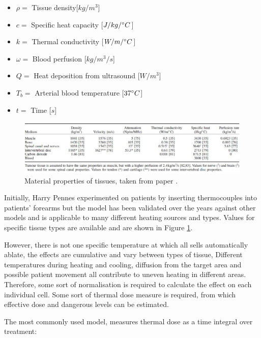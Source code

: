 \documentclass[11pt]{article} %
\begin{document}
	\begin{itemize}
		\item $ \rho = $ Tissue density[$ kg/m^3 $]
		\item  $ c= $ Specific heat capacity [$ J/kg/\degree C  $]
		\item $ k= $ Thermal conductivity  [$ W/m/\degree C $]
		\item $ \omega = $ Blood perfusion [$ kg/m^3/s $]
		\item $ Q= $ Heat deposition from ultrasound $ [W/m^3 $]
		\item $ T_b= $ Arterial blood temperature [$ 37\degree C $]
		\item $ t= $ Time [$ s $]
	\end{itemize}
	
	
	
	\begin{figure}
		\centering
		\includegraphics[width=1\linewidth]{Report_images/tissueproperties}
		\caption{Material properties of tissues, taken from paper \cite{Scott2014}.}
		\label{fig:tissueproperties}
	\end{figure}
	
	Initially, Harry Pennes experimented on patients by inserting thermocouples into patients' forearms but the model has been validated over the years against other models and is applicable to many different heating sources and types. Values for specific tissue types are available and are shown in Figure \ref{fig:tissueproperties}. 
	
	However, there is not one specific temperature at which all sells automatically ablate, the effects are cumulative and vary between types of tissue, Different temperatures during heating and cooling, diffusion from the target area and possible patient movement all contribute to uneven heating in different areas. Therefore, some sort of normalisation is required to calculate the effect on each individual cell. Some sort of thermal dose measure is required, from which effective dose and dangerous levels can be estimated. 
	
	
	
	The most commonly used model, \cite{Sapareto1984a}  measures thermal dose as a time integral over treatment:
	
\end{document}
